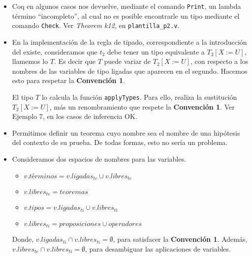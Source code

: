 \documentclass[a4paper,11pt]{article}
\begin{document}
\begin{itemize}
  \item Coq en algunos casos nos devuelve, mediante el comando \texttt{Print}, un lambda término ``incompleto'', al cual no es posible encontrarle
  un tipo mediante el comando \texttt{Check}. Ver \textit{Theorem k12}, en \texttt{plantilla\_p2.v}.
  
  \item En la implementación de la regla de tipado, correspondiente a la introducción del existe, consideramos que $t_{2}$ debe tener un tipo equivalente
  a $T_{2}[X:=U]$, llamemos lo $T$. Es decir que $T$ puede variar de $T_{2}[X:=U]$, con respecto a los nombres de las variables de tipo ligadas que aparecen en 
  el segundo.
  Hacemos esto para respetar la \textbf{Convención 1}. 
  
  El tipo $T$ lo calcula la función \texttt{applyTypes}. Para ello, realiza la sustitución $T_{2}[X:=U]$, más un renombramiento que respete la \textbf{Convención 1}.
  Ver Ejemplo 7, en los casos de inferencia OK.
  
  
  \item Permitimos definir un teorema cuyo nombre sea el nombre de una hipótesis del contexto de
  su prueba. De todas formas, esto no sería un problema.
  
  \item Consideramos dos espacios de nombres para las variables.
  \begin{itemize}
    \item $v.términos = v.ligadas_{te} \cup v.libres_{te}$
    \item $v.libres_{te} = teoremas$
    \item $v.tipos = v.ligadas_{ti} \cup v.libres_{ti}$
    \item $v.libres_{ti} = proposiciones \cup operadores$
  \end{itemize}
  
  Donde, $v.ligadas_{ti} \cap v.libres_{ti} = \emptyset$, para satisfacer la \textbf{Convención 1}.
  Además, $v.libres_{te} \cap v.libres_{ti} = \emptyset$, para desambiguar las aplicaciones de variables.
  

\end{itemize}
\end{document}
